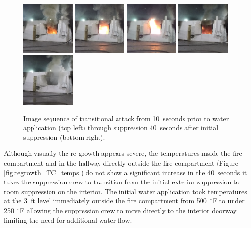 \documentclass[12pt,oneside]{book}
\begin{document}
\begin{figure}[H]
\includegraphics[width=0.24\textwidth]{../0_Images/Tactical_Considerations/Regrowth/20_Sec_Post}
\includegraphics[width=0.24\textwidth]{../0_Images/Tactical_Considerations/Regrowth/25_Sec_Post}
\includegraphics[width=0.24\textwidth]{../0_Images/Tactical_Considerations/Regrowth/30_Sec_Post}
\includegraphics[width=0.24\textwidth]{../0_Images/Tactical_Considerations/Regrowth/35_Sec_Post}
\includegraphics[width=0.24\textwidth]{../0_Images/Tactical_Considerations/Regrowth/40_Sec_Post}
\caption[Exterior Suppression Regrowth Images]{Image sequence of transitional attack from 10~seconds prior to water application (top left) through suppression 40~seconds after initial suppression (bottom right).}
\label{fig:regrowth_TC_image_sequence}
\end{figure}

Although visually the re-growth appears severe, the temperatures inside the fire compartment and in the hallway directly outside the fire compartment (Figure \ref{fig:regrowth_TC_temps}) do not show a significant increase in the 40~seconds it takes the suppression crew to transition from the initial exterior suppression to room suppression on the interior. The initial water application took temperatures at the 3~ft level immediately outside the fire compartment from 500~$^\circ$F to under 250~$^\circ$F allowing the suppression crew to move directly to the interior doorway limiting the need for additional water flow.
\end{document}
